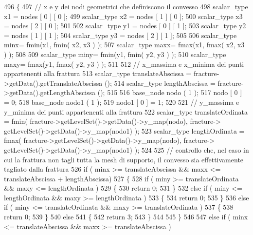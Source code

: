 \begin{DoxyCode}
496 \{
497     \textcolor{comment}{// x e y dei nodi geometrici che definiscono il convesso}
498     scalar\_type x1 = nodes [ 0 ] [ 0 ];
499     scalar\_type x2 = nodes [ 1 ] [ 0 ];
500     scalar\_type x3 = nodes [ 2 ] [ 0 ];
501 
502     scalar\_type y1 = nodes [ 0 ] [ 1 ];
503     scalar\_type y2 = nodes [ 1 ] [ 1 ];
504     scalar\_type y3 = nodes [ 2 ] [ 1 ];
505 
506     scalar\_type minx= fmin(x1, fmin( x2, x3 ) );
507     scalar\_type maxx= fmax(x1, fmax( x2, x3 ) );
508 
509     scalar\_type miny= fmin(y1, fmin( y2, y3 ) );
510     scalar\_type maxy= fmax(y1, fmax( y2, y3 ) );
511 
512     \textcolor{comment}{// x\_massima e x\_minima dei punti appartenenti alla frattura}
513     scalar\_type translateAbscissa = fracture->getData().getTranslateAbscissa ();
514     scalar\_type lengthAbscissa = fracture->getData().getLengthAbscissa ();
515 
516     base\_node nodo ( 1 );
517     nodo [ 0 ] = 0;
518     base\_node nodo1 ( 1 );
519     nodo1 [ 0 ] = 1;
520 
521     \textcolor{comment}{// y\_massima e y\_minima dei punti appartenenti alla frattura}
522     scalar\_type translateOrdinata = fmin( fracture->getLevelSet()->getData()->y\_map(nodo), fracture->
      getLevelSet()->getData()->y\_map(nodo1) );
523     scalar\_type lengthOrdinata = fmax( fracture->getLevelSet()->getData()->y\_map(nodo), fracture->
      getLevelSet()->getData()->y\_map(nodo1) );
524 
525     \textcolor{comment}{// controllo che, nel caso in cui la frattura non tagli tutta la mesh di supporto, il convesso sia
       effettivamente tagliato dalla frattura}
526     \textcolor{keywordflow}{if} ( minx >= translateAbscissa && maxx <= translateAbscissa + lengthAbscissa)
527     \{   
528         \textcolor{keywordflow}{if} ( miny >= translateOrdinata && maxy <= lengthOrdinata )
529         \{   
530             \textcolor{keywordflow}{return} 0;
531         \}
532         \textcolor{keywordflow}{else} \textcolor{keywordflow}{if} ( miny <= lengthOrdinata && maxy >= lengthOrdinata )
533         \{   
534             \textcolor{keywordflow}{return} 0;
535         \}
536         \textcolor{keywordflow}{else} \textcolor{keywordflow}{if} ( miny <= translateOrdinata && maxy >= translateOrdinata )
537         \{   
538             \textcolor{keywordflow}{return} 0;
539         \}
540         \textcolor{keywordflow}{else}
541         \{   
542             \textcolor{keywordflow}{return} 3;
543         \}
544 
545     \}
546 
547     \textcolor{keywordflow}{else} \textcolor{keywordflow}{if} ( minx <= translateAbscissa && maxx >= translateAbscissa )

\end{DoxyCode}
